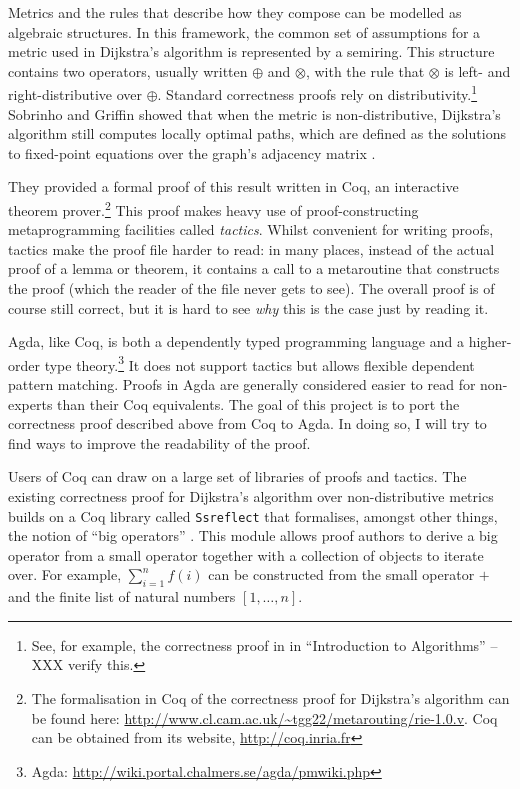 \documentclass[a4paper]{scrartcl}
\begin{document}
Metrics and the rules that describe how they compose can be modelled as algebraic structures. In this framework, the common set of assumptions for a metric used in Dijkstra's algorithm is represented by a semiring. This structure contains two operators, usually written \(\oplus\) and \(\otimes\), with the rule that \(\otimes\) is left- and right-distributive over \(\oplus\). Standard correctness proofs rely on distributivity.\footnote{See, for example, the correctness proof in in \enquote{Introduction to Algorithms} \autocite[XXX]{cormen_introduction_2009} -- XXX verify this.} Sobrinho and Griffin showed that when the metric is non-distributive, Dijkstra's algorithm still computes locally optimal paths, which are defined as the solutions to fixed-point equations over the graph's adjacency matrix \autocite{sobrinho_routing_2010}.

They provided a formal proof of this result written in Coq, an interactive theorem prover.\footnote{The formalisation in Coq of the correctness proof for Dijkstra's algorithm can be found here: \url{http://www.cl.cam.ac.uk/~tgg22/metarouting/rie-1.0.v}. Coq can be obtained from its website, \url{http://coq.inria.fr}} This proof makes heavy use of proof-constructing metaprogramming facilities called \emph{tactics}. Whilst convenient for writing proofs, tactics make the proof file harder to read: in many places, instead of the actual proof of a lemma or theorem, it contains a call to a metaroutine that constructs the proof (which the reader of the file never gets to see). The overall proof is of course still correct, but it is hard to see \emph{why} this is the case just by reading it.

Agda, like Coq, is both a dependently typed programming language and a higher-order type theory.\footnote{Agda: \url{http://wiki.portal.chalmers.se/agda/pmwiki.php}} 
It does not support tactics but allows flexible dependent pattern matching. Proofs in Agda are generally considered easier to read for non-experts than their Coq equivalents. The goal of this project is to port the correctness proof described above from Coq to Agda. In doing so, I will try to find ways to improve the readability of the proof.

Users of Coq can draw on a large set of libraries of proofs and tactics. The existing correctness proof for Dijkstra's algorithm over non-distributive metrics builds on a Coq library called \texttt{Ssreflect} that formalises, amongst other things, the notion of \enquote{big operators} \autocite{bertot_canonical_2008}. This module allows proof authors to derive a big operator from a small operator together with a collection of objects to iterate over. For example, \(\sum_{i=1}^n f(i)\) can be constructed from the small operator \(+\) and the finite list of natural numbers \([1, \dots, n]\).
\end{document}
